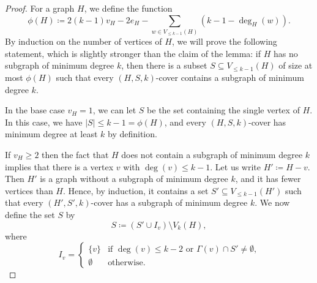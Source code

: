 \documentclass[11pt]{article}
\numberwithin{theorem}{section}
\begin{document}
\begin{proof}
  For a graph $H$, we define the function
  \begin{equation} \label{eq:defphi}
  \phi(H)\coloneqq 2(k-1)v_H-2e_H-\sum_{w \in V_{\le k - 1}(H)} (k - 1 - \deg_H(w)).  
  \end{equation}
  By induction on the number of vertices of $H$, we will prove the following
  statement, which is slightly stronger than the claim of the lemma: if $H$ has
  no subgraph of minimum degree $k$, then there is a subset $S\subseteq V_{\leq
  k-1}(H)$ of size at most $\phi(H)$ such that every $(H,S,k)$-cover contains a
  subgraph of minimum degree $k$.

  In the base case $v_H=1$, we can let $S$ be the set containing the single
  vertex of $H$. In this case, we have $|S| \leq k-1=\phi(H)$, and every
  $(H,S,k)$-cover has minimum degree at least $k$ by definition.

  If $v_H \geq 2$ then the fact that $H$ does not contain a subgraph of minimum
  degree $k$ implies that there is a vertex $v$ with $\deg(v) \leq k-1$. Let
  us write $H'\coloneqq H-v$. Then $H'$ is a graph without a subgraph of
  minimum degree $k$, and it has fewer vertices than $H$. Hence, by induction,
  it contains a set $S'\subseteq V_{\leq k-1}(H')$ such that every
  $(H',S',k)$-cover has a subgraph of minimum degree $k$.
  We now define the set $S$ by
  \begin{equation*}
    S\coloneqq(S'\cup I_v) \setminus V_k(H),
  \end{equation*}
  where
  \begin{equation*}
    I_v =
    \begin{cases}
      \{v\} & \text{if $\deg(v)\leq k-2$ or $\Gamma(v)\cap S' \neq \emptyset$,} \\
      \emptyset & \text{otherwise.}
    \end{cases}
  \end{equation*}


\end{proof}
\end{document}
